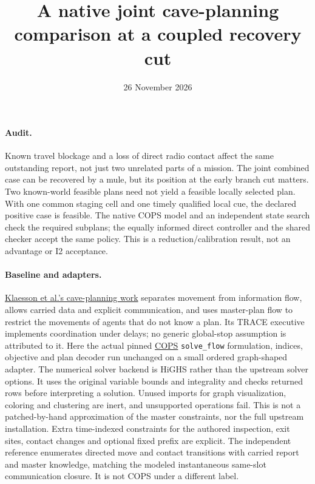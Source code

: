 \documentclass[11pt]{article}
\begin{document}
\title{A native joint cave-planning comparison at a coupled recovery cut}
\author{}
\date{26 November 2026}
\maketitle

\paragraph{Audit.}
Known travel blockage and a loss of direct radio contact affect the
same outstanding report, not just two unrelated parts of a mission.
The joint combined case can be recovered by a mule, but its position
at the early branch cut matters. Two known-world feasible plans
need not yield a feasible locally selected plan. With one common
staging cell and one timely qualified local cue, the declared
positive case is feasible. The native COPS model and an independent
state search check the required subplans; the equally informed direct
controller and the shared checker accept the same policy. This is a
reduction/calibration result, not an advantage or I2 acceptance.

\paragraph{Baseline and adapters.}
\href{https://ntrs.nasa.gov/citations/20220001447}{Klaesson et al.'s
cave-planning work} separates movement from information flow,
allows carried data and explicit communication, and uses master-plan
flow to restrict the movements of agents that do not know a plan.
Its TRACE executive implements coordination under delays; no
generic global-stop assumption is attributed to it. Here the
actual pinned \href{https://github.com/FilipKlaesson/cops/tree/67d2e5dd4534b3f3eec95b6cfda9d4c9c1746ef0}{COPS}
\texttt{solve\_flow} formulation, indices, objective and plan decoder
run unchanged on a small ordered graph-shaped adapter. The numerical
solver backend is HiGHS rather than the upstream solver options. It
uses the original variable bounds and integrality and checks returned
rows before interpreting a solution. Unused imports for graph
visualization, coloring and clustering are inert, and unsupported
operations fail. This is not a patched-by-hand approximation of the
master constraints, nor the full upstream installation. Extra
time-indexed constraints for the authored inspection, exit sites,
contact changes and optional fixed prefix are explicit. The
independent reference enumerates directed move and contact transitions
with carried report and master knowledge, matching the modeled
instantaneous same-slot communication closure. It is not COPS
under a different label.
\end{document}
